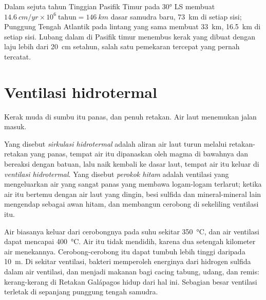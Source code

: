 \begin{example}\label{ex:g11:ocean-ridges:rates}
Dalam sejuta tahun Tinggian Pasifik Timur pada \ang{30} LS membuat
$\qty{14.6}{cm/yr} \times 10^6\ \text{tahun} = \qty{146}{km}$ dasar samudra
baru, \qty{73}{km} di setiap sisi; Punggung Tengah Atlantik pada lintang yang
sama membuat \qty{33}{km}, \qty{16.5}{km} di setiap sisi. Lubang dalam di
Pasifik timur menembus kerak yang dibuat dengan laju lebih dari \qty{20}{cm}
setahun, salah satu pemekaran tercepat yang pernah tercatat.
\end{example}

\section{Ventilasi hidrotermal}

Kerak muda di sumbu itu panas, dan penuh retakan. Air laut menemukan jalan
masuk.

\begin{definition}\label{def:g11:ocean-ridges:hydrothermal}
Yang disebut \emph{sirkulasi hidrotermal} adalah
aliran air laut turun melalui retakan-retakan  yang panas, tempat
air itu dipanaskan oleh magma di bawahnya dan bereaksi dengan batuan, lalu naik
kembali ke dasar laut, tempat air itu keluar di \emph{ventilasi hidrotermal}.
Yang disebut \emph{perokok hitam} adalah ventilasi yang
mengeluarkan air yang sangat panas yang membawa logam-logam terlarut; ketika air
itu bertemu dengan air laut yang dingin, besi sulfida dan mineral-mineral lain
mengendap sebagai awan hitam, dan membangun cerobong di sekeliling ventilasi itu.
\end{definition}

Air  biasanya keluar dari cerobongnya pada suhu sekitar
\qty{350}{\celsius}, dan air ventilasi dapat mencapai \qty{400}{\celsius}. Air
itu tidak mendidih, karena dua setengah kilometer air menekannya. Cerobong-cerobong
itu dapat tumbuh lebih tinggi daripada \qty{10}{m}. Di sekitar ventilasi,
bakteri memperoleh energinya dari hidrogen sulfida dalam air ventilasi, dan
menjadi makanan bagi cacing tabung, udang, dan remis: kerang-kerang di Retakan
Galápagos hidup dari hal ini. Sebagian besar ventilasi terletak di sepanjang
punggung tengah samudra.


